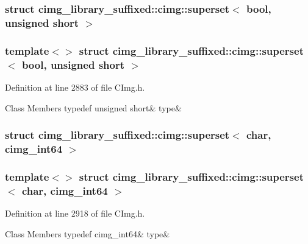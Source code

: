 \subsubsection{struct cimg\+\_\+library\+\_\+suffixed\+:\+:cimg\+:\+:superset$<$ bool, unsigned short $>$}
\subsubsection*{template$<$$>$\newline
struct cimg\+\_\+library\+\_\+suffixed\+::cimg\+::superset$<$ bool, unsigned short $>$}



Definition at line 2883 of file C\+Img.\+h.

\begin{DoxyFields}{Class Members}
\mbox{\label{namespacecimg__library__suffixed_1_1cimg_afecefd8d0d371269d4836767bd56c25c}} 
typedef unsigned short&
type&
\\
\hline

\end{DoxyFields}
\label{structcimg__library__suffixed_1_1cimg_1_1superset_3_01char_00_01cimg__int64_01_4}
\subsubsection{struct cimg\+\_\+library\+\_\+suffixed\+:\+:cimg\+:\+:superset$<$ char, cimg\+\_\+int64 $>$}
\subsubsection*{template$<$$>$\newline
struct cimg\+\_\+library\+\_\+suffixed\+::cimg\+::superset$<$ char, cimg\+\_\+int64 $>$}



Definition at line 2918 of file C\+Img.\+h.

\begin{DoxyFields}{Class Members}
\mbox{\label{namespacecimg__library__suffixed_1_1cimg_abb8cc94a168e4a48b9c1f7f0bdd6bbb3}} 
typedef cimg\_int64&
type&
\\
\hline

\end{DoxyFields}
\label{structcimg__library__suffixed_1_1cimg_1_1superset_3_01char_00_01cimg__uint64_01_4}
